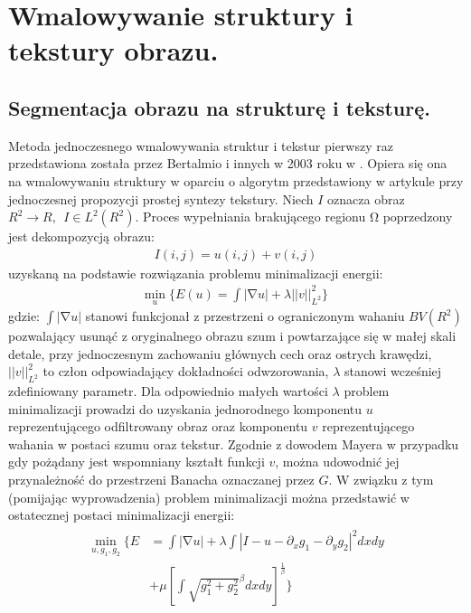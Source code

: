 \documentclass[12pt, twoside, openany]{report}
\theoremstyle{definition}
\begin{document}
\section{Wmalowywanie struktury i tekstury obrazu.}\label{chap:StructureTextureNavierStokes}
\subsection{Segmentacja obrazu na strukturę i teksturę.}
Metoda jednoczesnego wmalowywania struktur i tekstur pierwszy raz przedstawiona została przez Bertalmio i innych w 2003 roku w \cite{NavierStokesAndTexturePropagation}. Opiera się ona na wmalowywaniu struktury w oparciu o algorytm przedstawiony w artykule przy jednoczesnej propozycji prostej syntezy tekstury. Niech $I$ oznacza obraz $R^2\to R,\ \ I\in L^2(R^2)$. Proces wypełniania brakującego regionu $\mathrm{\Omega }$ poprzedzony jest dekompozycją obrazu:
\begin{align}
I\left(i,j\right)=u\left(i,j\right)+v\left(i,j\right) 
\label{STRUCTURETEXTURE1}
\end{align}
uzyskaną na podstawie rozwiązania problemu minimalizacji energii:
\begin{align} 
{\mathop{\mathrm{min}}_{u} \Biggl\{E\left(u\right)=\int{\left|\mathrm{\nabla }u\right|+\lambda {\left|\left|v\right|\right|}^2_{L^2}}\Biggr\}\ }
\label{STRUCTURETEXTURE2}
\end{align}
gdzie: $\int{\left|\mathrm{\nabla }u\right|}$ stanowi funkcjonał z przestrzeni o ograniczonym wahaniu $BV(R^2)$ pozwalający usunąć z oryginalnego obrazu szum i powtarzające się w małej skali detale, przy jednoczesnym zachowaniu głównych cech oraz ostrych krawędzi, ${\left|\left|v\right|\right|}^2_{L^2}$ to człon odpowiadający dokładności odwzorowania, $\lambda $ stanowi wcześniej zdefiniowany parametr. Dla odpowiednio małych wartości $\lambda $ problem minimalizacji prowadzi do uzyskania jednorodnego komponentu $u$ reprezentującego odfiltrowany obraz oraz komponentu $v$ reprezentującego wahania w postaci szumu oraz tekstur. Zgodnie z dowodem Mayera w przypadku gdy pożądany jest wspomniany kształt funkcji $v$, można udowodnić jej  przynależność do przestrzeni Banacha oznaczanej przez $G$. W związku z tym (pomijając wyprowadzenia) problem minimalizacji można przedstawić w ostatecznej postaci minimalizacji energii:
\begin{align}
\begin{aligned} 
\mathop{\mathrm{min}}_{u,g_1,g_2} \Biggl\{E &= \int{\left|\mathrm{\nabla }u\right|+\lambda \int{{\left|I-u-{\partial }_xg_1-{\partial }_yg_2\right|}^2dxdy}} \\
&+ \mu {\left[\int{{\sqrt{g^2_1+g^2_2}}^\beta dxdy}\right]}^{\frac{1}{\beta}}\Biggr\}
\end{aligned}
\end{align}
\end{document}
